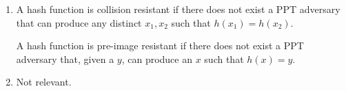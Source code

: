 


\begin{enumerate}[label=(\alph*)]
  \item
    A hash function is collision resistant if there does not exist a PPT adversary that can produce any distinct $x_1, x_2$ such that $h(x_1) = h(x_2)$.

    A hash function is pre-image resistant if there does not exist a PPT adversary that, given a $y$, can produce an $x$ such that $h(x) = y$.

  \item
    Not relevant.
        
\end{enumerate}

